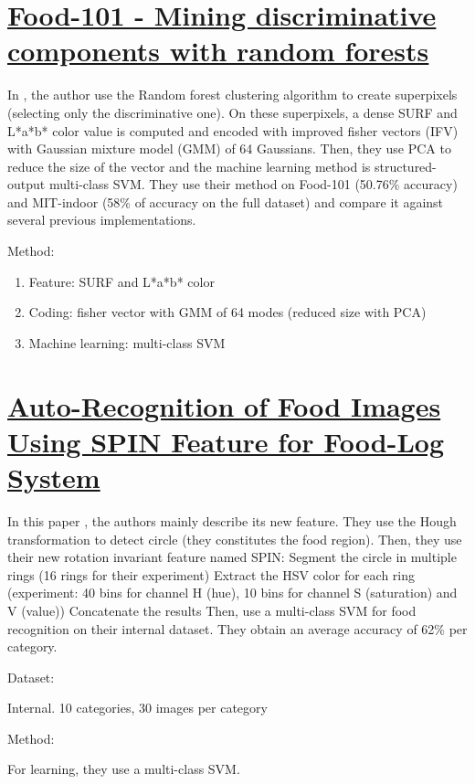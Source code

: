 \section{\href{http://link.springer.com/chapter/10.1007/978-3-319-10599-4_29}{Food-101 - Mining discriminative components with random forests}}

In \cite{Bossard2014}, the author use the Random forest clustering algorithm to create superpixels (selecting only the discriminative one). On these superpixels, a dense SURF and L*a*b* color value is computed and encoded with improved fisher vectors (IFV) with Gaussian mixture model (GMM) of 64 Gaussians.
Then, they use PCA to reduce the size of the vector and the machine learning method is structured-output multi-class SVM. They use their method on Food-101 (50.76\% accuracy) and MIT-indoor (58\% of accuracy on the full dataset) and compare it against several previous implementations.

Method:
\begin{enumerate}
    \item Feature: SURF and L*a*b* color
    \item Coding: fisher vector with GMM of 64 modes (reduced size with PCA)
    \item Machine learning: multi-class SVM
\end{enumerate}

\section{\href{http://ieeexplore.ieee.org/xpls/abs_all.jsp?arnumber=6316741}{Auto-Recognition of Food Images Using SPIN Feature for Food-Log System}}

In this paper \cite{Wazumi2011}, the authors mainly describe its new feature. They use the Hough transformation to detect circle (they constitutes the food region). Then, they use their new rotation invariant feature named SPIN:
Segment the circle in multiple rings (16 rings for their experiment) 
Extract the HSV color for each ring (experiment: 40 bins for channel H (hue), 10 bins for channel S (saturation) and V (value))
Concatenate the results
Then, use a multi-class SVM for food recognition on their internal dataset.
They obtain an average accuracy of 62\% per category.

Dataset:

Internal. 10 categories, 30 images per category

Method:

For learning, they use a multi-class SVM.

